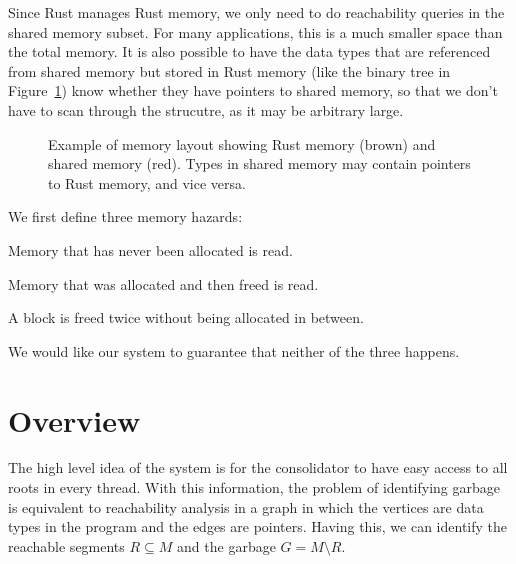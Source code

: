 Since Rust manages Rust memory, we only need to do reachability queries in the shared memory
subset. For many applications, this is a much smaller space than the total memory. It is also
possible to have the data types that are referenced from shared memory but stored in Rust memory
(like the binary tree in Figure~\ref{fig:rust-shared-mem}) know whether they have pointers to
shared memory, so that we don't have to scan through the strucutre, as it may be arbitrary large.


\begin{figure}
  \centering
  
  \caption{Example of memory layout showing Rust memory (brown) and shared memory (red). Types in
  shared memory may contain pointers to Rust memory, and vice versa.\label{fig:rust-shared-mem}}
\end{figure}

We first define three memory hazards:

\begin{definition}
  Memory that has never been allocated is read.
\end{definition}

\begin{definition}
  Memory that was allocated and then freed is read.
\end{definition}

\begin{definition}
  A block is freed twice without being allocated in between.
\end{definition}

We would like our system to guarantee that neither of the three happens.

\section{Overview\label{sec:cmr-overview}}

The high level idea of the system is for the consolidator to have easy access to all roots in every
thread. With this information, the problem of identifying garbage is equivalent to reachability
analysis in a graph in which the vertices are data types in the program and the edges are pointers.
 Having this, we can
identify the reachable segments $R \subseteq M$ and the garbage $G = M \setminus R$.

